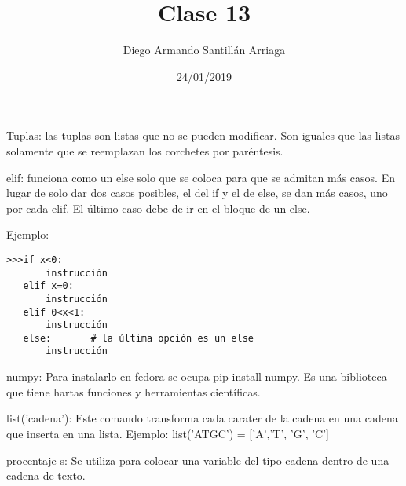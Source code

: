 \documentclass[letter paper, 12pt, oneside]{article}
\title{\Huge Clase 13}
\author{Diego Armando Santillán Arriaga}
\date{24/01/2019}
\begin{document}
	\maketitle	
	\newpage
	
Tuplas:
las tuplas son listas que no se pueden modificar. Son iguales que las listas solamente que se reemplazan los corchetes por paréntesis. 

elif: funciona como un else solo que se coloca para que se admitan más casos. En lugar de solo dar dos casos posibles, el del if y el de else, se dan más casos, uno por cada elif. El último caso debe de ir en el bloque de un else. 
 
Ejemplo:
\begin{verbatim}
>>>if x<0:
       instrucción
   elif x=0:
       instrucción
   elif 0<x<1:
       instrucción
   else:       # la última opción es un else
       instrucción
\end{verbatim}

numpy:
Para instalarlo en fedora se ocupa pip install numpy. Es una biblioteca que tiene hartas funciones y herramientas científicas.   
     	
list('cadena'):
Este comando transforma cada carater de la cadena en una cadena que inserta en una lista. 
Ejemplo:
list('ATGC') = ['A','T', 'G', 'C']

procentaje s:
Se utiliza para colocar una variable del tipo cadena dentro de una cadena de texto.
\end{document}
